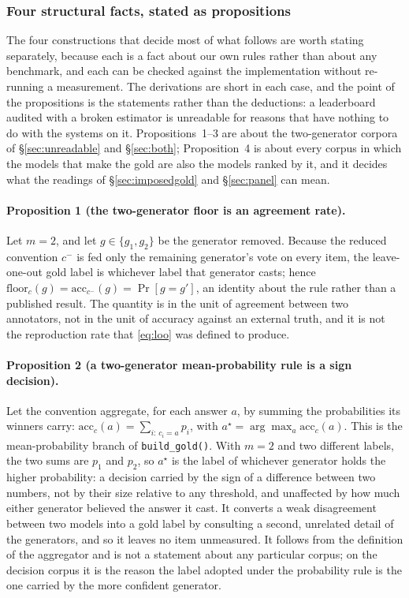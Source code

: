 \documentclass{article}
\newcommand{\ids}[1]{\texttt{\small #1}} %
\begin{document}
\subsubsection{Four structural facts, stated as propositions}
\label{sec:props} The four constructions that decide most of what follows are worth stating separately, because each is a fact about our own rules rather than about any benchmark, and each can be checked against the implementation without re-running a measurement. The derivations are short in each case, and the point of the propositions is the statements rather than the deductions: a leaderboard audited with a broken estimator is unreadable for reasons that have nothing to do with the systems on it. Propositions~1--3 are about the two-generator corpora of \S\ref{sec:unreadable} and \S\ref{sec:both}; Proposition~4 is about every corpus in which the models that make the gold are also the models ranked by it, and it decides what the readings of \S\ref{sec:imposedgold} and \S\ref{sec:panel} can mean.

\paragraph{Proposition 1 (the two-generator floor is an agreement rate).} Let $m = 2$, and let $g \in \{g_1, g_2\}$ be the generator removed. Because the reduced convention $c^-$ is fed only the remaining generator's vote on every item, the leave-one-out gold label is whichever label that generator casts; hence $\mathrm{floor}_c(g) = \mathrm{acc}_{c^-}(g) = \Pr[g = g']$, an identity about the rule rather than a published result. The quantity is in the unit of agreement between two annotators, not in the unit of accuracy against an external truth, and it is not the reproduction rate that \eqref{eq:loo} was defined to produce.

\paragraph{Proposition 2 (a two-generator mean-probability rule is a sign decision).} Let the convention aggregate, for each answer $a$, by summing the probabilities its winners carry: $\mathrm{acc}_c(a) = \sum_{i:\,c_i = a} p_i$, with $a^{\star} = \arg\max_a \mathrm{acc}_c(a)$. This is the mean-probability branch of \ids{build\_gold()}. With $m=2$ and two different labels, the two sums are $p_1$ and $p_2$, so $a^{\star}$ is the label of whichever generator holds the higher probability: a decision carried by the sign of a difference between two numbers, not by their size relative to any threshold, and unaffected by how much either generator believed the answer it cast. It converts a weak disagreement between two models into a gold label by consulting a second, unrelated detail of the generators, and so it leaves no item unmeasured. It follows from the definition of the aggregator and is not a statement about any particular corpus; on the decision corpus it is the reason the label adopted under the probability rule is the one carried by the more confident generator.
\end{document}
